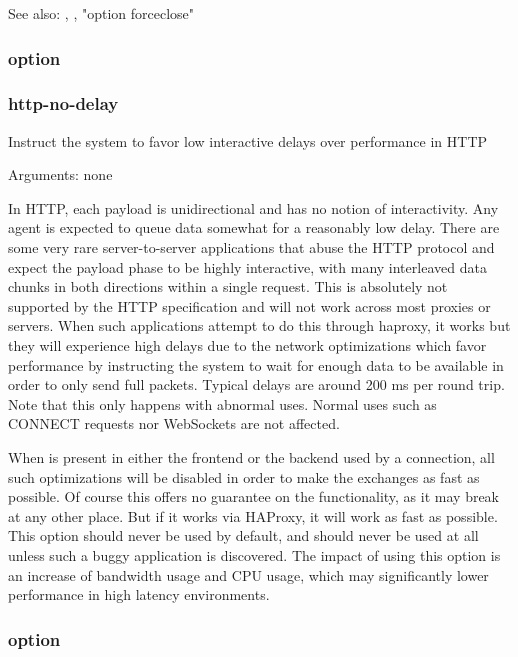   See also: , ,
             "option forceclose"

\subsubsection[http-no-delay]{option }
\subsubsection*{http-no-delay}


  Instruct the system to favor low interactive delays over performance in HTTP


  Arguments: none

  In HTTP, each payload is unidirectional and has no notion of interactivity.
  Any agent is expected to queue data somewhat for a reasonably low delay.
  There are some very rare server-to-server applications that abuse the HTTP
  protocol and expect the payload phase to be highly interactive, with many
  interleaved data chunks in both directions within a single request. This is
  absolutely not supported by the HTTP specification and will not work across
  most proxies or servers. When such applications attempt to do this through
  haproxy, it works but they will experience high delays due to the network
  optimizations which favor performance by instructing the system to wait for
  enough data to be available in order to only send full packets. Typical
  delays are around 200 ms per round trip. Note that this only happens with
  abnormal uses. Normal uses such as CONNECT requests nor WebSockets are not
  affected.

  When  is present in either the frontend or the backend
  used by a connection, all such optimizations will be disabled in order to
  make the exchanges as fast as possible. Of course this offers no guarantee on
  the functionality, as it may break at any other place. But if it works via
  HAProxy, it will work as fast as possible. This option should never be used
  by default, and should never be used at all unless such a buggy application
  is discovered. The impact of using this option is an increase of bandwidth
  usage and CPU usage, which may significantly lower performance in high
  latency environments.

\subsubsection[http-pretend-keepalive]{option }

